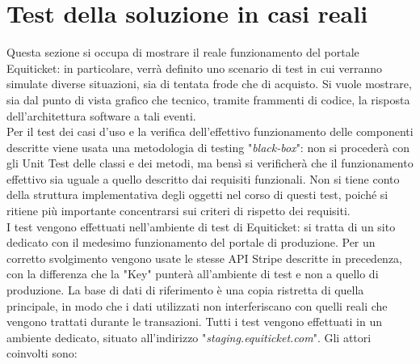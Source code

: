 \section{Test della soluzione in casi reali} \label{sec:testing}
Questa sezione si occupa di mostrare il reale funzionamento del portale Equiticket: in particolare, verrà definito uno scenario di test in cui verranno simulate diverse situazioni, sia di tentata frode che di acquisto. Si vuole mostrare, sia dal punto di vista grafico che tecnico, tramite frammenti di codice, la risposta dell'architettura software a tali eventi. \\
Per il test dei casi d'uso e la verifica dell'effettivo funzionamento delle componenti descritte viene usata una metodologia di testing "\emph{black-box}": non si procederà con gli Unit Test delle classi e dei metodi, ma bensì si verificherà che il funzionamento effettivo sia uguale a quello descritto dai requisiti funzionali. Non si tiene conto della struttura implementativa degli oggetti nel corso di questi test, poiché si ritiene più importante concentrarsi sui criteri di rispetto dei requisiti. \\
I test vengono effettuati nell'ambiente di test di Equiticket: si tratta di un sito dedicato con il medesimo funzionamento del portale di produzione. Per un corretto svolgimento vengono usate le stesse API Stripe descritte in precedenza, con la differenza che la "Key" punterà all'ambiente di test e non a quello di produzione. La base di dati di riferimento è una copia ristretta di quella principale, in modo che i dati utilizzati non interferiscano con quelli reali che vengono trattati durante le transazioni. 
Tutti i test vengono effettuati in un ambiente dedicato, situato all'indirizzo "\emph{staging.equiticket.com}".
Gli attori coinvolti sono: 
